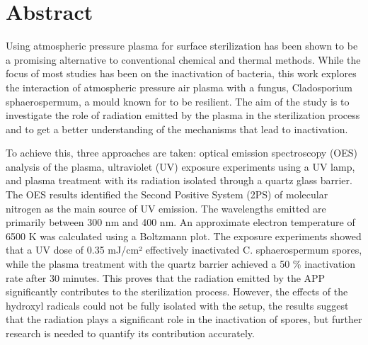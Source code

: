 \chapter*{Abstract}
Using atmospheric pressure plasma for surface sterilization has been shown to be a promising alternative to conventional chemical and thermal methods. While the focus of most studies has been on the inactivation of bacteria, this work explores the interaction of atmospheric pressure air plasma with a fungus, Cladosporium sphaerospermum, a mould known for to be resilient. The aim of the study is to investigate the role of radiation emitted by the plasma in the sterilization process and to get a better understanding of the mechanisms that lead to inactivation.

To achieve this, three approaches are taken: optical emission spectroscopy (OES) analysis of the plasma, ultraviolet (UV) exposure experiments using a UV lamp, and plasma treatment with its radiation isolated through a quartz glass barrier. The OES results identified the Second Positive System (2PS) of molecular nitrogen as the main source of UV emission. The wavelengths emitted are primarily between 300 nm and 400 nm. An approximate electron temperature of 6500 K was calculated using a Boltzmann plot. The exposure experiments showed that a UV dose of 0.35 mJ/cm² effectively inactivated C. sphaerospermum spores, while the plasma treatment with the quartz barrier achieved a 50 \% inactivation rate after 30 minutes. This proves that the radiation emitted by the APP significantly contributes to the sterilization process. However, the effects of the hydroxyl radicals could not be fully isolated with the setup, the results suggest that the radiation plays a significant role in the inactivation of spores, but further research is needed to quantify its contribution accurately.